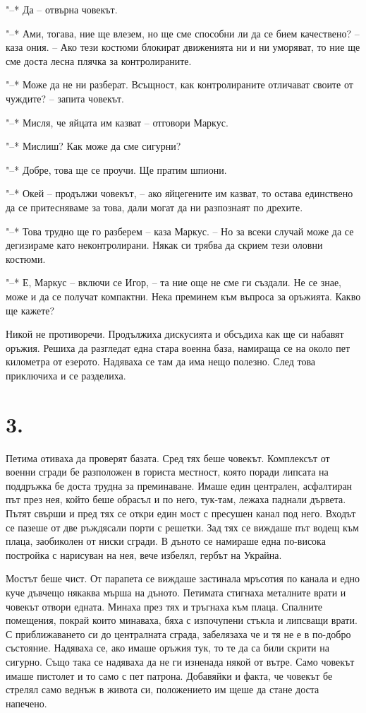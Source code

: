 \documentclass[ebook,openany,12pt]{memoir}
\begin{document}
"--* Да -- отвърна човекът.

"--* Ами, тогава, ние ще влезем, но ще сме способни ли да се бием качествено? – каза ония. – Ако тези костюми блокират движенията ни и ни уморяват, то ние ще сме доста лесна плячка за контролираните.

"--* Може да не ни разберат. Всъщност, как контролираните отличават своите от чуждите? – запита човекът.

"--* Мисля, че яйцата им казват – отговори Маркус.

"--* Мислиш? Как може да сме сигурни?

"--* Добре, това ще се проучи. Ще пратим шпиони.

"--* Окей -- продължи човекът, – ако яйцегените им казват, то остава единствено да се притесняваме за това, дали могат да ни разпознаят по дрехите.

"--* Това трудно ще го разберем – каза Маркус. – Но за всеки случай може да се дегизираме като неконтролирани. Някак си трябва да скрием тези оловни костюми.

"--* Е, Маркус – включи се Игор, – та ние още не сме ги създали. Не се знае, може и да се получат компактни. Нека преминем към въпроса за оръжията. Какво ще кажете?

Никой не противоречи. Продължиха дискусията и обсъдиха как ще си набавят оръжия. Решиха да разгледат една стара военна база, намираща се на около пет километра от езерото. Надяваха се там да има нещо полезно. След това приключиха и се разделиха.

\section*{3.}

Петима отиваха да проверят базата. Сред тях беше човекът. Комплексът от военни сгради бе разположен в гориста местност, която поради липсата на поддръжка бе доста трудна за преминаване. Имаше един централен, асфалтиран път през нея, който беше обрасъл и по него, тук-там, лежаха паднали дървета. Пътят свърши и пред тях се откри един мост с пресушен канал под него. Входът се пазеше от две ръждясали порти с решетки. Зад тях се виждаше път водещ към плаца, заобиколен от ниски сгради. В дъното се намираше една по-висока постройка с нарисуван на нея, вече избелял, гербът на Украйна.

Мостът беше чист. От парапета се виждаше застинала мръсотия по канала и едно куче дъвчещо някаква мърша на дъното. Петимата стигнаха металните врати и човекът отвори едната. Минаха през тях и тръгнаха към плаца. Спалните помещения, покрай които минаваха, бяха с изпочупени стъкла и липсващи врати. С приближаването си до централната сграда, забелязаха че и тя не е в по-добро състояние. Надяваха се, ако имаше оръжия тук, то те да са били скрити на сигурно. Също така се надяваха да не ги изненада някой от вътре. Само човекът имаше пистолет и то само с пет патрона. Добавяйки и факта, че човекът бе стрелял само веднъж в живота си, положението им щеше да стане доста напечено.
\end{document}

